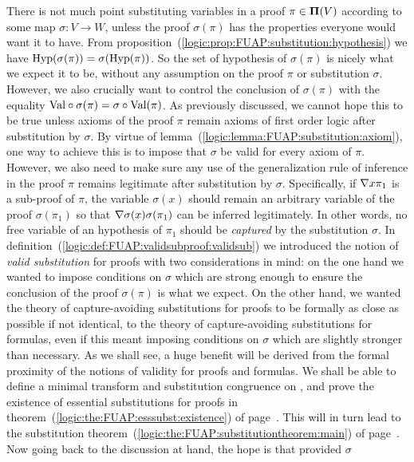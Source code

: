 There is not much point substituting variables in a proof
$\pi\in\mbox{${\bf\Pi}(V)$}$ according to some map $\sigma:V\to W$, unless the proof
$\sigma(\pi)$ has the properties everyone would want it to have.
From proposition~(\ref{logic:prop:FUAP:substitution:hypothesis}) we
have $\mbox{\rm Hyp}(\sigma(\pi))=\sigma(\mbox{\rm Hyp}(\pi))$. So the set of hypothesis
of $\sigma(\pi)$ is nicely what we expect it to be, without any
assumption on the proof $\pi$ or substitution $\sigma$. However, we
also crucially want to control the conclusion of $\sigma(\pi)$ with
the equality $\mbox{\rm Val}\circ\sigma(\pi)=\sigma\circ\mbox{\rm Val}(\pi)$. As
previously discussed, we cannot hope this to be true unless axioms
of the proof $\pi$ remain axioms of first order logic after
substitution by $\sigma$. By virtue of
lemma~(\ref{logic:lemma:FUAP:substitution:axiom}), one way to
achieve this is to impose that $\sigma$ be valid for every axiom of
$\pi$. However, we also need to make sure any use of the
generalization rule of inference in the proof $\pi$ remains
legitimate after substitution by $\sigma$. Specifically, if $\mbox{$\nabla$}
x\pi_{1}$ is a sub-proof of $\pi$, the variable $\sigma(x)$ should
remain an arbitrary variable of the proof $\sigma(\pi_{1})$ so that
$\mbox{$\nabla$}\sigma(x)\sigma(\pi_{1})$ can be inferred legitimately. In
other words, no free variable of an hypothesis of $\pi_{1}$ should
be {\em captured} by the substitution $\sigma$. In
definition~(\ref{logic:def:FUAP:validsubproof:validsub}) we
introduced the notion of {\em valid substitution} for proofs with
two considerations in mind: on the one hand we wanted to impose
conditions on $\sigma$ which are strong enough to ensure the
conclusion of the proof $\sigma(\pi)$ is what we expect. On the
other hand, we wanted the theory of capture-avoiding substitutions
for proofs to be formally as close as possible if not identical, to
the theory of capture-avoiding substitutions for formulas, even if
this meant imposing conditions on $\sigma$ which are slightly
stronger than necessary. As we shall see, a huge benefit will be
derived from the formal proximity of the notions of validity for
proofs and formulas. We shall be able to define a minimal transform
and substitution congruence on \pvs, and prove the existence of
essential substitutions for proofs in
theorem~(\ref{logic:the:FUAP:esssubst:existence}) of
page~\pageref{logic:the:FUAP:esssubst:existence}. This will in turn
lead to the substitution
theorem~(\ref{logic:the:FUAP:substitutiontheorem:main}) of
page~\pageref{logic:the:FUAP:substitutiontheorem:main}. Now going
back to the discussion at hand, the hope is that provided $\sigma$
